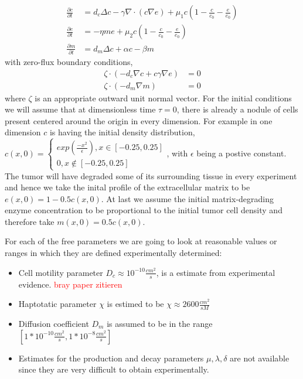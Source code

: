 \begin{align*}
	\frac{\partial c}{\partial t} &= d_c \Delta c - \gamma \nabla \cdot (c\nabla e)  + \mu_1 c\left(1-\frac{c}{c_0}-\frac{e}{e_0}\right)
    \\
	\frac{\partial e}{\partial t} &= -\eta m e  + \mu_2 c\left(1-\frac{c}{c_0}-\frac{e}{e_0}\right)\\
	\frac{\partial m}{\partial t} &= d_m \Delta c + \alpha c - \beta m
\end{align*}
with zero-flux boundary conditions, 
\begin{align*}
	\zeta \cdot (-d_c \nabla c + c \gamma \nabla e) &= 0 \\
	\zeta \cdot (-d_m\nabla m ) &= 0
\end{align*}
where $\zeta$ is an appropriate outward unit normal vector.\newline 
For the initial conditions we will assume that at dimensionless time $\tau = 0$, there is already a nodule of cells present centered around the origin in every dimension. For example in one dimension $c$ is having the initial density distribution,
$
c(x,0)=
\begin{cases}
exp(\frac{-x^2}{\epsilon}), x\in [-0.25, 0.25]\\
0, x\notin [-0.25,0.25]
\end{cases}
$, with $\epsilon$ being a postive constant. 
The tumor will have degraded some of its surrounding tissue in every experiment and hence we take the inital profile of the extracellular matrix to be $e(x,0) = 1 - 0.5 c(x,0)$. At last we assume the initial matrix-degrading enzyme concentration to be proportional to the initial tumor cell density and therefore take $m(x,0) = 0.5 c(x,0)$.

For each of the free parameters we are going to look at reasonable values or ranges in which they are defined experimentally determined: 
\begin{itemize}
    \item Cell motility parameter $D_c \approx 10^{-10} \frac{cm^2}{s}$, is a estimate from experimental evidence. \textcolor{red}{bray paper zitieren}
    \item Haptotatic parameter $\chi$ is estimed to be $\chi \approx 2600 \frac{cm^2}{sM}$
    \item Diffusion coefficient $D_m$ is assumed to be in the range $[1* 10^{-10} \frac{cm^2}{s},1* 10^{-8} \frac{cm^2}{s}]$
    \item Estimates for the production and decay parameters $\mu, \lambda, \delta$ are not available since they are very difficult to obtain experimentally. 
\end{itemize}


